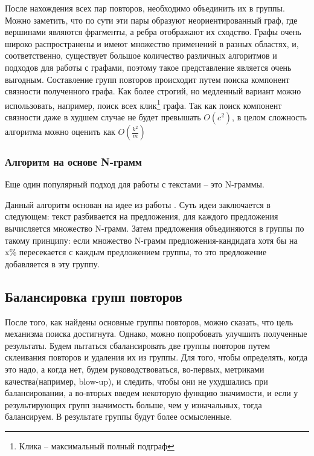 \documentclass[14pt]{matmex-diploma-custom}
\begin{document}
После нахождения всех пар повторов, необходимо объединить их в группы. Можно заметить, что по сути эти пары образуют неориентированный граф, где вершинами являются фрагменты, а ребра отображают их сходство. Графы очень широко распространены и имеют множество применений в разных областях, и, соответственно, существует большое количество различных алгоритмов и подходов для работы с графами, поэтому такое представление является очень выгодным. Составление групп повторов происходит путем поиска компонент связности полученного графа. Как более строгий, но медленный вариант можно использовать, например, поиск всех клик\footnote{Клика -- максимальный полный подграф} графа. Так как поиск компонент связности даже в худшем случае не будет превышать $O(c^2)$, в целом сложность алгоритма можно оценить как $O(\frac{k^2}{m})$

\subsubsection{Алгоритм на основе N-грамм}

Еще один популярный подход для работы с текстами -- это N-граммы. 

Данный алгоритм основан на идее из работы \cite{bib:tool:ImprovedNgramSearch}. Суть идеи заключается в следующем: текст разбивается на предложения, для каждого предложения вычисляется множество N-грамм. Затем предложения объединяются в группы по такому принципу: если множество N-грамм предложения-кандидата хотя бы на x\% пересекается с каждым предложением группы, то это предложение добавляется в эту группу.


\subsection{Балансировка групп повторов}

После того, как найдены основные группы повторов, можно сказать, что цель механизма поиска достигнута. Однако, можно попробовать улучшить полученные результаты. Будем пытаться сбалансировать две группы повторов путем склеивания повторов и удаления их из группы. Для того, чтобы определять, когда это надо, а когда нет, будем руководствоваться, во-первых, метриками качества(например, blow-up\cite{bib:art:JuergensCloneDetect}), и следить, чтобы они не ухудшались при балансировании, а во-вторых введем некоторую функцию значимости, и если у результирующих групп значимость больше, чем у изначальных, тогда балансируем. В результате группы будут более осмысленные.
\end{document}
